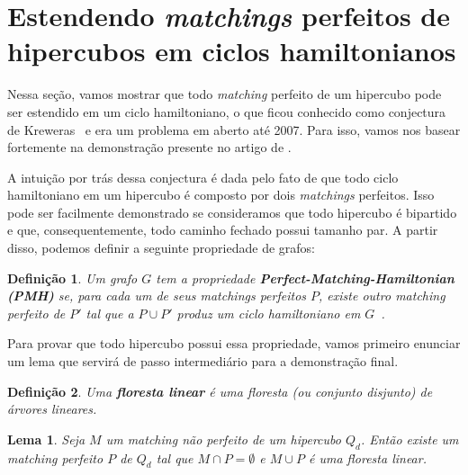 \documentclass[12pt, a4paper]{article}
\newtheorem{definition}{Definição}[section]
\newtheorem{lemma}{Lema}[section]
\begin{document}
\section{Estendendo \textit{matchings} perfeitos de hipercubos em ciclos hamiltonianos}

Nessa seção, vamos mostrar que todo \textit{matching} perfeito de um hipercubo pode ser estendido em um ciclo hamiltoniano, o que ficou conhecido como conjectura de Kreweras~\cite{kreweras_matchings_1996} e era um problema em aberto até 2007. Para isso, vamos nos basear fortemente na demonstração presente no artigo de \citet{fink_perfect_2007}.

A intuição por trás dessa conjectura é dada pelo fato de que todo ciclo hamiltoniano em um hipercubo é composto por dois \textit{matchings} perfeitos. Isso pode ser facilmente demonstrado se consideramos que todo hipercubo é bipartido e que, consequentemente, todo caminho fechado possui tamanho par. A partir disso, podemos definir a seguinte propriedade de grafos:

\begin{definition}
    Um grafo $G$ tem a propriedade \textbf{\textit{Perfect-Matching-Hamiltonian} (PMH)} se, para cada um de seus \textit{matchings} perfeitos $P$, existe outro \textit{matching} perfeito de $P'$ tal que a $P \cup P'$ produz um ciclo hamiltoniano em $G$~\cite{abreu_perfect_2022}.
\end{definition}

Para provar que todo hipercubo possui essa propriedade, vamos primeiro enunciar um lema que servirá de passo intermediário para a demonstração final.

\begin{definition}
    Uma {\bf floresta linear} é uma floresta (ou conjunto disjunto) de árvores lineares.
\end{definition}

\begin{lemma} \label{lemma:matching-linear-forest}
    Seja $M$ um \textit{matching} não perfeito de um hipercubo $Q_d$. Então existe um \textit{matching} perfeito $P$ de $Q_d$ tal que $M \cap P = \emptyset$ e $M \cup P$ é uma floresta linear. 
\end{lemma}
\end{document}
